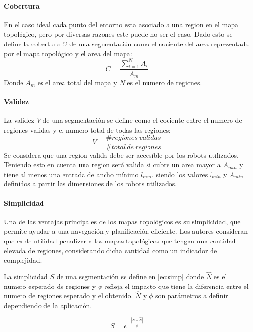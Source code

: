 \paragraph{Cobertura}
En el caso ideal cada punto del entorno esta asociado a una region en el mapa topológico, pero por diversas razones este puede no ser el caso. Dado esto se define la cobertura $C$ de una segmentación como el cociente del area representada por el mapa topológico y el area del mapa:
\begin{equation}
C=\frac{\sum^N_{i=1} A_i}{A_m}
\end{equation}
Donde $A_m$ es el area total del mapa y $N$ es el numero de regiones.

\paragraph{Validez}
La validez $V$ de una segmentación se define como el cociente entre el numero de regiones validas y el numero total de todas las regiones:
\begin{equation}
  V=\frac{\#regiones\ validas}{\#total\ de\ regiones}
\end{equation}
Se considera que una region valida debe ser accesible por los robots utilizados. Teniendo esto en cuenta una region será valida si cubre un area mayor a $A_{min}$ y tiene al menos una entrada de ancho mínimo $l_{min}$, siendo los valores $l_{min}$ y $A_{min}$ definidos a partir las dimensiones de los robots utilizados.

\paragraph{Simplicidad}
Una de las ventajas principales de los mapas topológicos es su simplicidad, que permite ayudar a una navegación y planificación eficiente. Los autores consideran que es de utilidad penalizar a los mapas topológicos que tengan una cantidad elevada de regiones, considerando dicha cantidad como un indicador de complejidad. 

La simplicidad $S$ de una segmentación se define en \eqref{ec:simp} donde $\hat{N}$ es el numero esperado de regiones y $\phi$ refleja el impacto que tiene la diferencia entre el numero de regiones esperado y el obtenido. $\hat{N}$ y $\phi$ son parámetros a definir dependiendo de la aplicación.

\begin{equation}
  S=e^{-\frac{|N-\hat{N}|}{\phi}} \label{ec:simp}
\end{equation}



